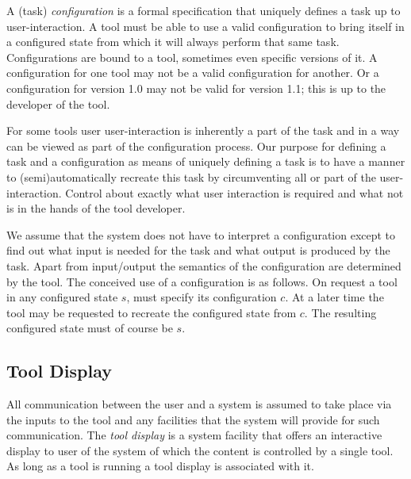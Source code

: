 \documentclass{article}
\begin{document}
   A (task) \textit{configuration} is a formal specification that uniquely
   defines a task up to user-interaction. A tool must be able to use a valid
   configuration to bring itself in a configured state from which it will
   always perform that same task. Configurations are bound to a tool, sometimes
   even specific versions of it. A configuration for one tool may not be a
   valid configuration for another. Or a configuration for version 1.0 may not
   be valid for version 1.1; this is up to the developer of the tool.
   
   For some tools user user-interaction is inherently a part of the task and in
   a way can be viewed as part of the configuration process. Our purpose for
   defining a task and a configuration as means of uniquely defining a task is
   to have a manner to (semi)automatically recreate this task by circumventing
   all or part of the user-interaction. Control about exactly what user
   interaction is required and what not is in the hands of the tool developer.

   We assume that the system does not have to interpret a configuration except
   to find out what input is needed for the task and what output is produced by
   the task. Apart from input/output the semantics of the configuration are
   determined by the tool. The conceived use of a configuration is as follows.
   On request a tool in any configured state $s$, must specify its
   configuration $c$.  At a later time the tool may be requested to recreate
   the configured state from $c$. The resulting configured state must of course
   be $s$.



  \subsection{Tool Display}

   All communication between the user and a system is assumed to take place via
   the inputs to the tool and any facilities that the system will provide for
   such communication. The \textit{tool display} is a system facility that
   offers an interactive display to user of the system of which the content is
   controlled by a single tool. As long as a tool is running a tool display is
   associated with it.
\end{document}
